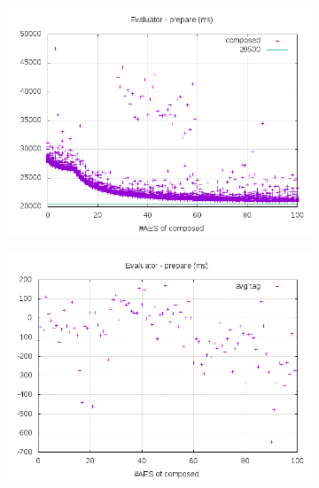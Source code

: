 \documentclass[10pt,a4paper]{article}
\begin{document}
\begin{figure}[h]
    \begin{subfigure}[t]{0.3\textwidth}
        \includegraphics[width=\textwidth]{eval_prepare_plots}
        \caption{}
    \end{subfigure}
    \begin{subfigure}[t]{0.3\textwidth}
        \includegraphics[width=\textwidth]{eval_prepare_avg}
        \caption{}
    \end{subfigure}
    \begin{subfigure}[t]{0.3\textwidth}

\end{subfigure}
\end{figure}
\end{document}
